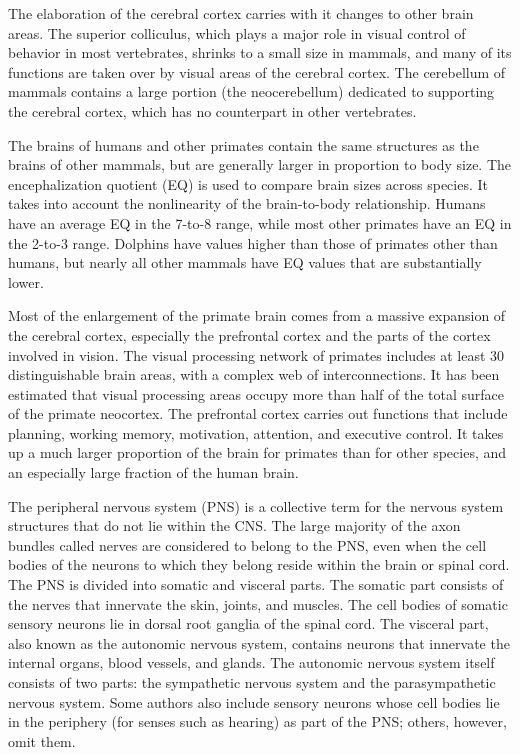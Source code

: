 \documentclass[]{book}
\begin{document}
The elaboration of the cerebral cortex carries with it changes to other brain areas. The superior colliculus, which plays a major role in visual control of behavior in most vertebrates, shrinks to a small size in mammals, and many of its functions are taken over by visual areas of the cerebral cortex. The cerebellum of mammals contains a large portion (the neocerebellum) dedicated to supporting the cerebral cortex, which has no counterpart in other vertebrates.

The brains of humans and other primates contain the same structures as the brains of other mammals, but are generally larger in proportion to body size. The encephalization quotient (EQ) is used to compare brain sizes across species. It takes into account the nonlinearity of the brain-to-body relationship. Humans have an average EQ in the 7-to-8 range, while most other primates have an EQ in the 2-to-3 range. Dolphins have values higher than those of primates other than humans, but nearly all other mammals have EQ values that are substantially lower.

Most of the enlargement of the primate brain comes from a massive expansion of the cerebral cortex, especially the prefrontal cortex and the parts of the cortex involved in vision. The visual processing network of primates includes at least 30 distinguishable brain areas, with a complex web of interconnections. It has been estimated that visual processing areas occupy more than half of the total surface of the primate neocortex. The prefrontal cortex carries out functions that include planning, working memory, motivation, attention, and executive control. It takes up a much larger proportion of the brain for primates than for other species, and an especially large fraction of the human brain.

The peripheral nervous system (PNS) is a collective term for the nervous system structures that do not lie within the CNS. The large majority of the axon bundles called nerves are considered to belong to the PNS, even when the cell bodies of the neurons to which they belong reside within the brain or spinal cord. The PNS is divided into somatic and visceral parts. The somatic part consists of the nerves that innervate the skin, joints, and muscles. The cell bodies of somatic sensory neurons lie in dorsal root ganglia of the spinal cord. The visceral part, also known as the autonomic nervous system, contains neurons that innervate the internal organs, blood vessels, and glands. The autonomic nervous system itself consists of two parts: the sympathetic nervous system and the parasympathetic nervous system. Some authors also include sensory neurons whose cell bodies lie in the periphery (for senses such as hearing) as part of the PNS; others, however, omit them.
\end{document}
